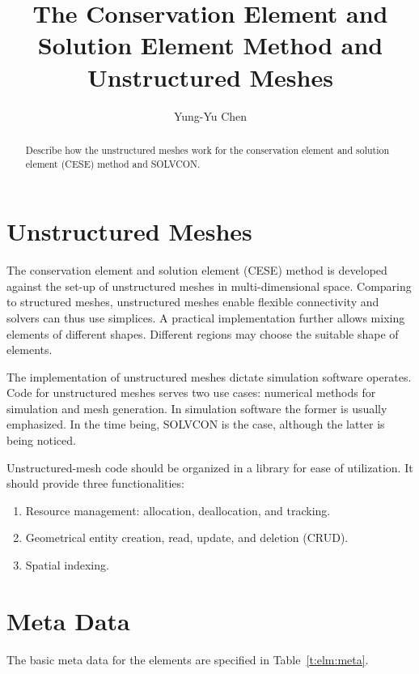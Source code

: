 \documentclass[11pt,dvips]{article}
\title{
%
The Conservation Element and Solution Element Method and Unstructured Meshes
%
}
\author{
%
Yung-Yu Chen
%
}
\numberwithin{equation}{section}
\begin{document}
\maketitle

\begin{abstract}
%
Describe how the unstructured meshes work for the conservation element and
solution element (CESE) method and SOLVCON.
%
\end{abstract}

\section{Unstructured Meshes}
%
\label{s:ust_intro}

The conservation element and solution element (CESE) method is developed
against the set-up of unstructured meshes in multi-dimensional
space\cite{mavriplis_unstructured_1997, wang_2d_1999}.  Comparing to structured
meshes, unstructured meshes enable flexible connectivity and solvers can thus
use simplices.  A practical implementation further allows mixing elements of
different shapes.  Different regions may choose the suitable shape of elements.

The implementation of unstructured meshes dictate simulation software operates.
Code for unstructured meshes serves two use cases: numerical methods for
simulation and mesh generation.  In simulation software the former is usually
emphasized.  In the time being, SOLVCON is the case, although the latter is
being noticed.

Unstructured-mesh code should be organized in a library for ease of
utilization.  It should provide three functionalities:
%
\begin{enumerate}
%
\item Resource management: allocation, deallocation, and tracking.
%
\item Geometrical entity creation, read, update, and deletion (CRUD).
%
\item Spatial indexing.
%
\end{enumerate}

\clearpage
%
\section{Meta Data}

The basic meta data for the elements are specified in Table~\ref{t:elm:meta}.
\end{document}

